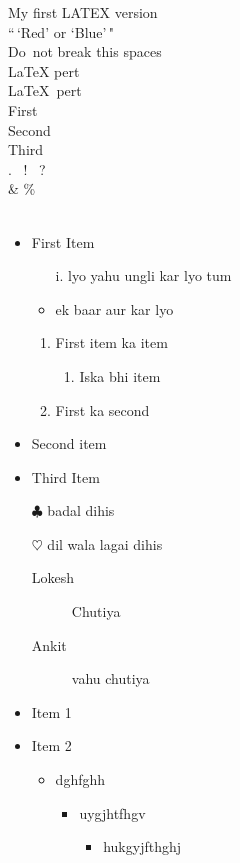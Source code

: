 \documentclass[12pt]{article}
\begin{document}
My first LATEX version\\
``\,`Red' or `Blue'\," \\
Do\ not break this spaces\\
\LaTeX{} pert\\
\LaTeX\ pert\\
First\\
Second\\[5mm]
Third\\
. \ ! \ ? \\
\&   \% \^ \\
\~ \\

\begin{itemize}
\item First Item 
\begin{itemize}
\item [i.] lyo yahu ungli kar lyo tum
\item ek baar aur kar lyo
\end{itemize}
\begin{enumerate}
\item First item ka item
\begin{enumerate}
\item Iska bhi  item 
\end{enumerate}
\item First ka second
\end{enumerate}
\item Second item
\item Third Item

\item [$\clubsuit$] badal dihis
\item [$\heartsuit$] dil wala lagai dihis

\begin{description}
\item [Lokesh] Chutiya 
\item [Ankit] vahu chutiya
\end{description}

\end{itemize}

\begin{itemize}
\item Item 1
\item Item 2
\begin{itemize}
\item dghfghh
\begin{itemize}
\item uygjhtfhgv
\begin{itemize}
\item hukgyjfthghj
\end{itemize}
\end{itemize}
\end{itemize}
\end{itemize}
\end{document}
